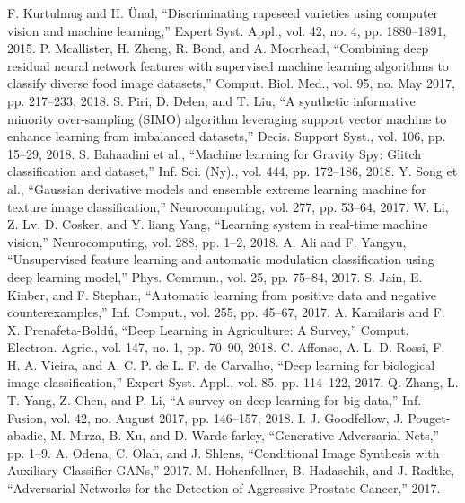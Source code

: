 \documentclass[conference]{IEEEtran}
\begin{document}
\begin{thebibliography}{00}
	F. Kurtulmuş and H. Ünal, “Discriminating rapeseed varieties using computer vision and machine learning,” Expert Syst. Appl., vol. 42, no. 4, pp. 1880–1891, 2015.
 	P. Mcallister, H. Zheng, R. Bond, and A. Moorhead, “Combining deep residual neural network features with supervised machine learning algorithms to classify diverse food image datasets,” Comput. Biol. Med., vol. 95, no. May 2017, pp. 217–233, 2018.
 S. Piri, D. Delen, and T. Liu, “A synthetic informative minority over-sampling (SIMO) algorithm leveraging support vector machine to enhance learning from imbalanced datasets,” Decis. Support Syst., vol. 106, pp. 15–29, 2018.
	S. Bahaadini et al., “Machine learning for Gravity Spy: Glitch classification and dataset,” Inf. Sci. (Ny)., vol. 444, pp. 172–186, 2018.
	Y. Song et al., “Gaussian derivative models and ensemble extreme learning machine for texture image classification,” Neurocomputing, vol. 277, pp. 53–64, 2017.
	W. Li, Z. Lv, D. Cosker, and Y. liang Yang, “Learning system in real-time machine vision,” Neurocomputing, vol. 288, pp. 1–2, 2018.
	A. Ali and F. Yangyu, “Unsupervised feature learning and automatic modulation classification using deep learning model,” Phys. Commun., vol. 25, pp. 75–84, 2017.
	S. Jain, E. Kinber, and F. Stephan, “Automatic learning from positive data and negative counterexamples,” Inf. Comput., vol. 255, pp. 45–67, 2017.
	A. Kamilaris and F. X. Prenafeta-Boldú, “Deep Learning in Agriculture: A Survey,” Comput. Electron. Agric., vol. 147, no. 1, pp. 70–90, 2018.
	C. Affonso, A. L. D. Rossi, F. H. A. Vieira, and A. C. P. de L. F. de Carvalho, “Deep learning for biological image classification,” Expert Syst. Appl., vol. 85, pp. 114–122, 2017.
	Q. Zhang, L. T. Yang, Z. Chen, and P. Li, “A survey on deep learning for big data,” Inf. Fusion, vol. 42, no. August 2017, pp. 146–157, 2018.
	I. J. Goodfellow, J. Pouget-abadie, M. Mirza, B. Xu, and D. Warde-farley, “Generative Adversarial Nets,” pp. 1–9.
	A. Odena, C. Olah, and J. Shlens, “Conditional Image Synthesis with Auxiliary Classifier GANs,” 2017.
	M. Hohenfellner, B. Hadaschik, and J. Radtke, “Adversarial Networks for the Detection of Aggressive Prostate Cancer,” 2017.


\end{thebibliography}
\end{document}
